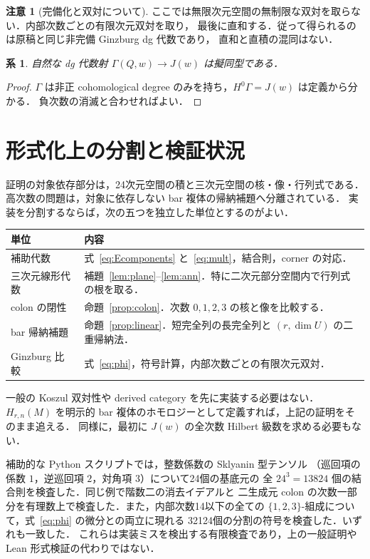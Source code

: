 \documentclass[a4paper,11pt]{ltjsarticle}
\newtheorem{corollary}[theorem]{系}
\theoremstyle{definition}
\newtheorem{remark}[theorem]{注意}
\begin{document}
\begin{remark}[完備化と双対について]
ここでは無限次元空間の無制限な双対を取らない．内部次数ごとの有限次元双対を取り，
最後に直和する．従って得られるのは原稿と同じ非完備 Ginzburg dg 代数であり，
直和と直積の混同はない．
\end{remark}

\begin{corollary}
自然な dg 代数射 $\Gamma(Q,w)\to J(w)$ は擬同型である．
\end{corollary}
\begin{proof}
$\Gamma$ は非正 cohomological degree のみを持ち，$H^0\Gamma=J(w)$ は定義から分かる．
負次数の消滅と合わせればよい．
\end{proof}

\section{形式化上の分割と検証状況}
証明の対象依存部分は，24次元空間の積と三次元空間の核・像・行列式である．
高次数の問題は，対象に依存しない bar 複体の帰納補題へ分離されている．
実装を分割するならば，次の五つを独立した単位とするのがよい．
\begin{center}
\begin{tabular}{p{}p{}}
\toprule
単位&内容\\\midrule
補助代数&式~\eqref{eq:Ecomponents} と~\eqref{eq:mult}，結合則，corner の対応．\\
三次元線形代数&補題~\ref{lem:plane}--\ref{lem:ann}．特に二次元部分空間内で行列式の根を取る．\\
colon の閉性&命題~\ref{prop:colon}．次数 $0,1,2,3$ の核と像を比較する．\\
bar 帰納補題&命題~\ref{prop:linear}．短完全列の長完全列と $(r,\dim U)$ の二重帰納法．\\
Ginzburg 比較&式~\eqref{eq:phi}，符号計算，内部次数ごとの有限次元双対．\\\bottomrule
\end{tabular}
\end{center}
一般の Koszul 双対性や derived category を先に実装する必要はない．
$H_{r,n}(M)$ を明示的 bar 複体のホモロジーとして定義すれば，上記の証明をそのまま追える．
同様に，最初に $J(w)$ の全次数 Hilbert 級数を求める必要もない．

補助的な Python スクリプトでは，整数係数の Sklyanin 型テンソル
（巡回項の係数 $1$，逆巡回項 $2$，対角項 $3$）について24個の基底元の
全 $24^3=13824$ 個の結合則を検査した．同じ例で階数二の消去イデアルと
二生成元 colon の次数一部分を有理数上で検査した．また，内部次数14以下の全ての
$\{1,2,3\}$-組成について，式~\eqref{eq:phi} の微分との両立に現れる
32124個の分割の符号を検査した．いずれも一致した．
これらは実装ミスを検出する有限検査であり，上の一般証明や Lean 形式検証の代わりではない．
\end{document}
